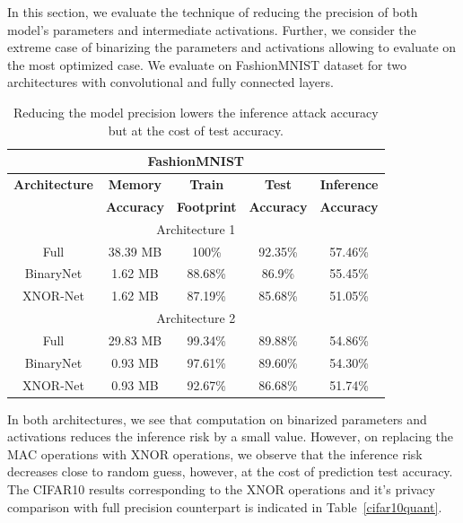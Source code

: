 In this section, we evaluate the technique of reducing the precision of both model's parameters and intermediate activations.
Further, we consider the extreme case of binarizing the parameters and activations allowing to evaluate on the most optimized case.
We evaluate on FashionMNIST dataset for two architectures with convolutional and fully connected layers.

\begin{table}[!htb]
\begin{center}
\renewcommand\arraystretch{1.5}
\fontsize{6.7pt}{6.7pt}\selectfont
\begin{tabular}{|c|c|c|c|c|}
\hline
\multicolumn{5}{|c|}{\textbf{FashionMNIST}}\\
\hline
\textbf{Architecture} & \textbf{Memory} & \textbf{Train}  & \textbf{Test}  & \textbf{Inference}  \\
 & \textbf{Accuracy} &  \textbf{Footprint} & \textbf{Accuracy} & \textbf{Accuracy}  \\
\hline
\multicolumn{5}{|c|}{Architecture 1}\\
Full & 38.39 MB & 100\% & 92.35\% & \cellcolor{red!25}57.46\%\\
BinaryNet & 1.62 MB & 88.68\% & 86.9\% & \cellcolor{green!25}55.45\%\\
XNOR-Net & 1.62 MB & 87.19\% & 85.68\% & \cellcolor{green!25}51.05\%\\ %
\hline
\multicolumn{5}{|c|}{Architecture 2}\\
Full & 29.83 MB & 99.34\% & 89.88\% & \cellcolor{red!25}54.86\% \\
BinaryNet & 0.93 MB & 97.61\% & 89.60\% & \cellcolor{green!25}54.30\%\\
XNOR-Net & 0.93 MB & 92.67\% & 86.68\% & \cellcolor{green!25}51.74\%\\ %
\hline
\end{tabular}
\end{center}
\caption{Reducing the model precision lowers the inference attack accuracy but at the cost of test accuracy.}
\label{fmnist_quantize}
\end{table}

In both architectures, we see that computation on  binarized parameters and activations reduces the inference risk by a small value.
However, on replacing the MAC operations with XNOR operations, we observe that the inference risk decreases close to random guess, however, at the cost of prediction test accuracy.
The CIFAR10 results corresponding to the XNOR operations and it's privacy comparison with full precision counterpart is indicated in Table~\ref{cifar10quant}.

